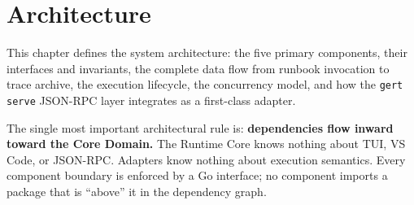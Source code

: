 \chapter{Architecture}
\label{ch:architecture}

This chapter defines the system architecture: the five primary components, their interfaces and invariants,
the complete data flow from runbook invocation to trace archive, the execution lifecycle, the concurrency model,
and how the \texttt{gert serve} JSON-RPC layer integrates as a first-class adapter.

The single most important architectural rule is: \textbf{dependencies flow inward toward the Core Domain.}
The Runtime Core knows nothing about TUI, VS Code, or JSON-RPC. Adapters know nothing about execution semantics.
Every component boundary is enforced by a Go interface; no component imports a package that is ``above'' it in
the dependency graph.


